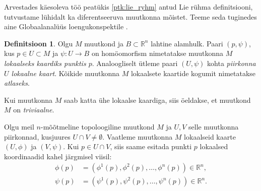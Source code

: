 \documentclass[12pt]{article}
\theoremstyle{plain}
\theoremstyle{definition}
\newtheorem{definitsioon}{Definitsioon}[section]
\numberwithin{equation}{section}
\def\R{{\mathbb R}}
\begin{document}
Arvestades käesoleva töö peatükis \ref{ptk:lie_ryhm} antud Lie 
rühma definitsiooni, tutvustame lühidalt ka diferentseeruva muutkonna 
mõistet. Teeme seda tuginedes aine Globaalanalüüs loengukonspektile 
\cite{globanal}.

\begin{definitsioon}
Olgu $M$ muutkond ja $B \subset \R^n$ lahtine alamhulk. Paari 
$\left(p, \psi\right)$, kus $p \in U \subset M$ ja 
$\psi : U \rightarrow B$ on homöomorfism nimetatakse muutkonna 
$M$ \emph{lokaalseks kaardiks punktis $p$}. Analoogliselt ütleme 
paari $\left(U, \psi\right)$ kohta \emph{piirkonna $U$ lokaalne 
kaart}. Kõikide muutkonna $M$ lokaalsete kaartide kogumit nimetatakse 
\emph{atlaseks}.

Kui muutkonna $M$ saab katta ühe lokaalse kaardiga, siis öeldakse, 
et muutkond $M$ on \emph{triviaalne}.
\end{definitsioon}

Olgu meil $n$-mõõtmeline topoloogiline muutkond $M$ ja $U,V$ selle 
muutkonna piirkonnad, kusjuures $U \cap V \neq \emptyset$. Vaatleme 
muutkonna $M$ lokaalseid kaarte $\left(U, \phi\right)$ ja 
$\left(V, \psi\right)$. Kui $p \in U \cap V$, siis saame esitada 
punkti $p$ lokaalsed koordinaadid kahel järgmisel viisil:
\begin{align*}
\phi\left(p\right) &= \left(\phi^1\left(p\right), 
\phi^2\left(p\right), \ldots, \phi^n\left(p\right)\right) \in \R^n, \\
\psi\left(p\right) &= \left(\psi^1\left(p\right), 
\psi^2\left(p\right), \ldots, \psi^n\left(p\right)\right) \in \R^n.
\end{align*}
\end{document}
